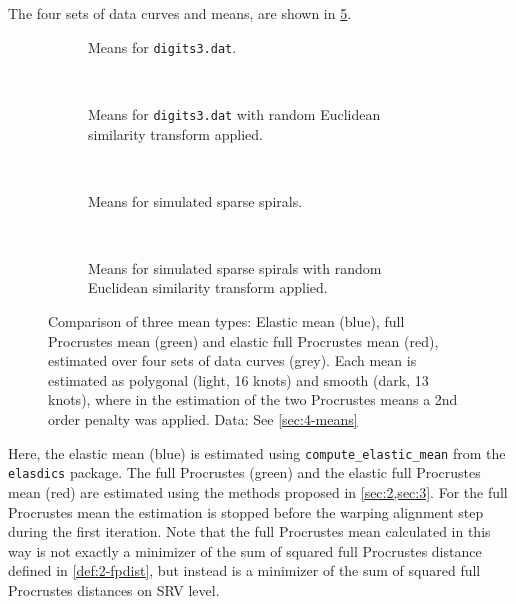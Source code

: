 The four sets of data curves and means, are shown in \cref{fig:4-means}.
\begin{figure}
  \centering
  \begin{subfigure}{\textwidth}
    \centering
    \caption{Means for \texttt{digits3.dat}.}
    \label{fig:41-digit3-means-a}
  \end{subfigure}\vspace{0.66em}\\
  \begin{subfigure}{\textwidth}
    \centering
    \caption{Means for \texttt{digits3.dat} with random Euclidean similarity transform applied.}
    \label{fig:41-digit3-means-b}
  \end{subfigure}\vspace{0.66em}\\
  \begin{subfigure}{\textwidth}
    \centering
    \caption{Means for simulated sparse spirals.}
    \label{fig:41-spiral-means-a}
  \end{subfigure}\vspace{0.66em}\\
  \begin{subfigure}{\textwidth}
    \centering
    \caption{Means for simulated sparse spirals with random Euclidean similarity transform applied.}
    \label{fig:41-spiral-means-b}
  \end{subfigure}
  \caption{Comparison of three mean types: Elastic mean (blue), full Procrustes mean (green) and elastic full Procrustes mean (red), estimated over four sets of data curves (grey).
  Each mean is estimated as polygonal (light, 16 knots) and smooth (dark, 13 knots), where in the estimation of the two Procrustes means a 2nd order penalty was applied.
  Data: See \cref{sec:4-means}}
  \label{fig:4-means}
\end{figure}
Here, the elastic mean (blue) is estimated using \texttt{compute\_elastic\_mean} from the \texttt{elasdics} package.
The full Procrustes (green) and the elastic full Procrustes mean (red) are estimated using the methods proposed in \cref{sec:2,sec:3}.
For the full Procrustes mean the estimation is stopped before the warping alignment step during the first iteration.
Note that the full Procrustes mean calculated in this way is not exactly a minimizer of the sum of squared full Procrustes distance defined in \cref{def:2-fpdist}, but instead is a minimizer of the sum of squared full Procrustes distances on SRV level.
